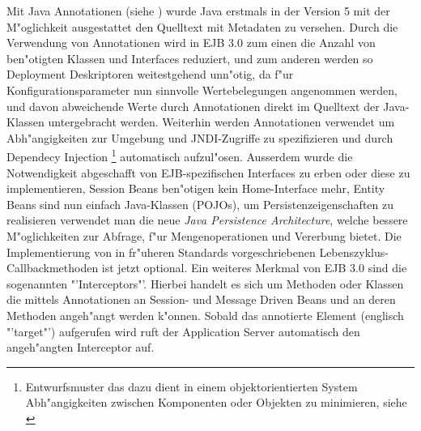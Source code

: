 Mit Java Annotationen (siehe \cite{JAVAANNOTATIONS}) wurde Java erstmals in der Version 5 mit der M"oglichkeit ausgestattet 
den Quelltext mit Metadaten zu versehen.
Durch die Verwendung von Annotationen wird in EJB 3.0 zum einen die Anzahl von ben"otigten Klassen und Interfaces reduziert,
und zum anderen werden so Deployment Deskriptoren weitestgehend unn"otig, da f"ur Konfigurationsparameter nun sinnvolle Wertebelegungen
angenommen werden, und davon abweichende Werte durch Annotationen direkt im Quelltext der Java-Klassen untergebracht werden.
Weiterhin werden Annotationen verwendet um Abh"angigkeiten zur Umgebung und JNDI-Zugriffe zu spezifizieren und durch
Dependecy Injection
\footnote{Entwurfsmuster das dazu dient in einem objektorientierten System Abh"angigkeiten zwischen Komponenten oder Objekten 
zu minimieren, siehe \cite{DEPINJ}}
automatisch aufzul"osen.
Ausserdem wurde die Notwendigkeit abgeschafft von EJB-spezifischen Interfaces zu erben oder diese zu implementieren, Session Beans
ben"otigen kein Home-Interface mehr, Entity Beans sind nun einfach Java-Klassen (POJOs), um Persistenzeigenschaften zu realisieren
verwendet man die neue \emph{Java Persistence Architecture}, welche bessere M"oglichkeiten zur Abfrage, f"ur Mengenoperationen und
Vererbung bietet. Die Implementierung von in fr"uheren Standards vorgeschriebenen Lebenszyklus-Callbackmethoden ist jetzt optional.
Ein weiteres Merkmal von EJB 3.0 sind die sogenannten "'Interceptors"'. Hierbei handelt es sich um Methoden oder Klassen die mittels
Annotationen an Session- und Message Driven Beans und an deren Methoden angeh"angt werden k"onnen. Sobald das annotierte Element 
(englisch "'target"') aufgerufen wird ruft der Application Server automatisch den angeh"angten Interceptor auf.



